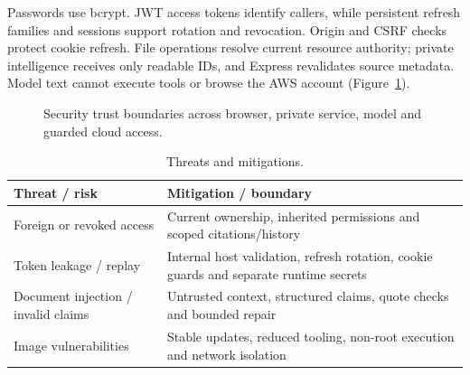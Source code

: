 Passwords use bcrypt. JWT access tokens identify callers, while persistent refresh families and sessions support rotation and revocation. Origin and CSRF checks protect cookie refresh. File operations resolve current resource authority; private intelligence receives only readable IDs, and Express revalidates source metadata. Model text cannot execute tools or browse the AWS account (Figure~\ref{fig:trust}).

\begin{figure}[htbp]
\centering
{}
\caption{Security trust boundaries across browser, private service, model and guarded cloud access.}
\label{fig:trust}
\end{figure}

\begin{table}[htbp]
\centering
\begin{tabularx}{\textwidth}{@{}p{5.0cm}L@{}}
\toprule
\textbf{Threat / risk} & \textbf{Mitigation / boundary}\\
\midrule
Foreign or revoked access & Current ownership, inherited permissions and scoped citations/history\\
Token leakage / replay & Internal host validation, refresh rotation, cookie guards and separate runtime secrets\\
Document injection / invalid claims & Untrusted context, structured claims, quote checks and bounded repair\\
Image vulnerabilities & Stable updates, reduced tooling, non-root execution and network isolation\\
\bottomrule
\end{tabularx}
\caption{Threats and mitigations.}
\label{tab:threats}
\end{table}

